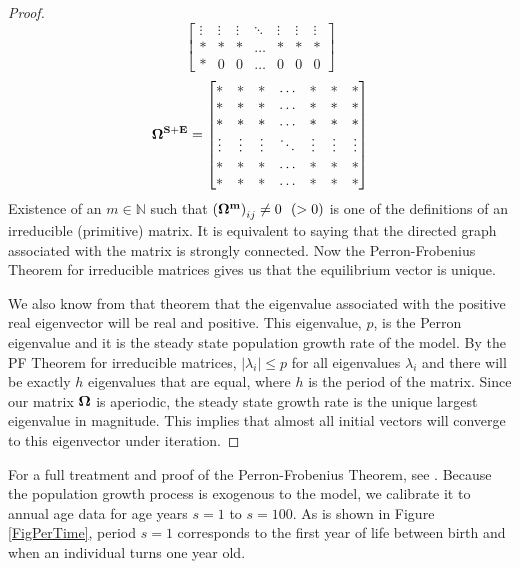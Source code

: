 \documentclass[12pt]{report}
\theoremstyle{definition}
\begin{document}
\begin{proof}
$$\begin{bmatrix}
    	\vdots & \vdots & \vdots & \ddots & \vdots & \vdots & \vdots \\
    	* & * & * & \hdots & * & * & * \\
    	* & 0 & 0 & \hdots & 0 & 0 & 0
    \end{bmatrix}
    $$
    $$\bf\Omega^{S+E} =
    \begin{bmatrix}
    	* & *  & * & \hdots & * & * & *\\
    	* & * & * & \hdots & * & * & * \\
    	* & * & * & \hdots & * & * & * \\
    	\vdots & \vdots & \vdots & \ddots & \vdots & \vdots & \vdots \\
    	* & * & * & \hdots & * & * & * \\
    	* & * & * & \hdots & * & * & *
    \end{bmatrix}
    $$
    Existence of an $m \in \mathbb N $ such that $\left(\bf\Omega^m\right)_{ij} \neq 0 ~~ ( > 0)$ is one of the definitions of an irreducible (primitive) matrix.  It is equivalent to saying that the directed graph associated with the matrix is strongly connected.  Now the Perron-Frobenius Theorem for irreducible matrices gives us that the equilibrium vector is unique.

    We also know from that theorem that the eigenvalue associated with the positive real eigenvector will be real and positive.  This eigenvalue, $p$, is the Perron eigenvalue and it is the steady state population growth rate of the model.  By the PF Theorem for irreducible matrices, $| \lambda_i | \leq p$ for all eigenvalues $\lambda_i$ and there will be exactly $h$ eigenvalues that are equal, where $h$ is the period of the matrix.  Since our matrix $\bf\Omega$ is aperiodic, the steady state growth rate is the unique largest eigenvalue in magnitude.  This implies that almost all initial vectors will converge to this eigenvector under iteration.
  \end{proof}

  For a full treatment and proof of the Perron-Frobenius Theorem, see \citet{Suzumura:1983}. Because the population growth process is exogenous to the model, we calibrate it to annual age data for age years $s=1$ to $s=100$. As is shown in Figure \ref{FigPerTime}, period $s=1$ corresponds to the first year of life between birth and when an individual turns one year old.
\end{document}
